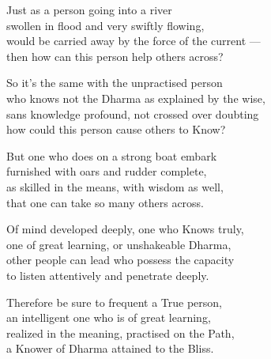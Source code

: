 \begin{MyDescription}{}
Just as a person going into a river\\
swollen in flood and very swiftly flowing,\\
would be carried away by the force of the current —\\
then how can this person help others across?
\end{MyDescription}

\begin{MyDescription}{}
So it's the same with the unpractised person\\
who knows not the Dharma as explained by the wise,\\
sans knowledge profound, not crossed over doubting\\
how could this person cause others to Know?
\end{MyDescription}   
 
\begin{MyDescription}{}
But one who does on a strong boat embark\\
furnished with oars and rudder complete,\\
as skilled in the means, with wisdom as well,\\
that one can take so many others across.
\end{MyDescription}   

\begin{MyDescription}{}
Of mind developed deeply, one who Knows truly,\\
one of great learning, or unshakeable Dharma,\\
other people can lead who possess the capacity\\
to listen attentively and penetrate deeply.
\end{MyDescription}   

\begin{MyDescription}{}
Therefore be sure to frequent a True person,\\
an intelligent one who is of great learning,\\
realized in the meaning, practised on the Path,\\
a Knower of Dharma attained to the Bliss.
\end{MyDescription}   

\begin{MyDescription}[(Sn. 316-323)]{}
\end{MyDescription}

